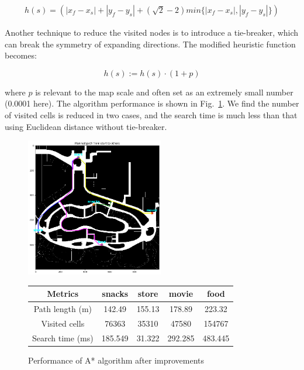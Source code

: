 \documentclass[hyperref]{article}
\theoremstyle{nonumberplain}
\begin{document}
\begin{equation}
\begin{aligned}
h(s) = (\left | x_{f}-x_{s} \right | + \left | y_{f}-y_{s} \right | + (\sqrt{2}-2)min\{\left | x_{f}-x_{s} \right |, \left | y_{f}-y_{s} \right |\})
\label{eq2}
\end{aligned}
\end{equation}

Another technique to reduce the visited nodes is to introduce a tie-breaker, which can break the symmetry of expanding directions. The modified heuristic function becomes:

\begin{equation}
h(s) := h(s)\cdot(1 + p)
\label{eq3}
\end{equation}

where $p$ is relevant to the map scale and often set as an extremely small number (0.0001 here). The algorithm performance is shown in Fig.~\ref{fig4}. We find the number of visited cells is reduced in two cases, and the search time is much less than that using Euclidean distance without tie-breaker.  


\begin{figure}[H]
	\begin{minipage}{.4\linewidth}
		\centering
		\includegraphics[width=6cm]{start_to_others_diagonal.png}
	\end{minipage}
	\begin{minipage}{.6\linewidth}
		\centering
		\begin{tabular}{|c|c|c|c|c|}
			\hline
			Metrics  &snacks &store &movie &food \\
			\hline
			Path length (m) &142.49 &155.13 &178.89 &223.32 \\
			Visited cells &76363 &35310 &47580 &154767\\
			Search time (ms) &185.549 &31.322 &292.285 &483.445 \\ 
			\hline
		\end{tabular}
	\end{minipage}
	\caption{Performance of A* algorithm after improvements}
	\label{fig4}
\end{figure}
\end{document}
